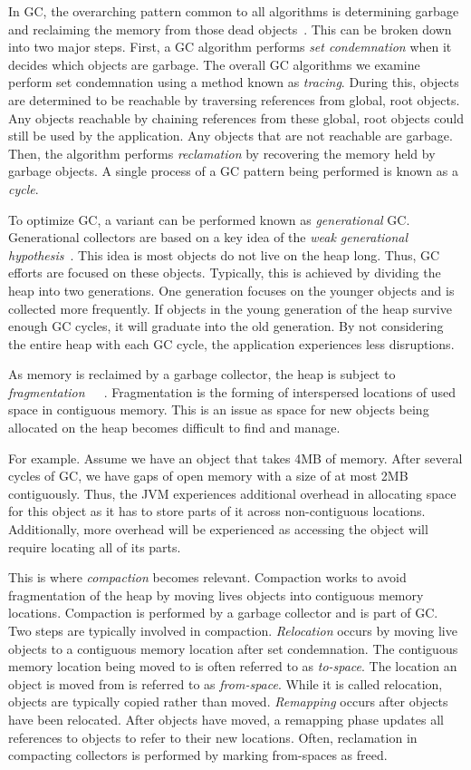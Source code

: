 \documentclass{sig-alternate}
\begin{document}
In GC, the overarching pattern common to all algorithms is determining garbage
and reclaiming the memory from those dead objects~\cite{wiki:gc}. This can be broken down into two major steps.
First, a GC algorithm performs \emph{set condemnation} when it decides which objects are 
garbage. The overall GC algorithms we examine perform set condemnation using a method 
known as \emph{tracing}. During this, objects are determined to be reachable by 
traversing references from global, root objects. Any objects reachable by chaining references
from these global, root objects could still be used by the application. 
Any objects that are not reachable are garbage.  Then, the algorithm performs 
\emph{reclamation} by recovering the memory held by garbage objects. A single
process of a GC pattern being performed is known as a \emph{cycle}.

To optimize GC, a variant can be performed known as \emph{generational} GC.
Generational collectors are based on a key idea of the \emph{weak generational hypothesis}~\cite{Tene:C4}.
This idea is most objects do not live on the 
heap long. Thus, GC efforts are focused on these objects. Typically, this is achieved
by dividing the heap into two generations. One generation focuses on the younger objects and
is collected more frequently. If objects in the young generation of the heap survive
enough GC cycles, it will graduate into the old generation. By not considering the entire
heap with each GC cycle, the application experiences less disruptions.

As memory is reclaimed by a garbage collector, the heap is subject to 
\emph{fragmentation}~\cite{Tene:C4}~\cite{Iyengar:Collie}~\cite{Osterlund:FPP}. Fragmentation is the forming
of interspersed locations of used space in contiguous memory. This
is an issue as space for new objects being allocated
on the heap becomes difficult to find and manage. 

For example. Assume
we have an object that takes 4MB of memory. After several cycles of GC,
we have gaps of open memory with a size of at most 2MB contiguously. Thus, 
the JVM experiences additional overhead in allocating space for this object
as it has to store parts of it across non-contiguous locations. Additionally,
more overhead will be experienced as accessing the object will require locating
all of its parts.

This is where \emph{compaction} becomes relevant. Compaction works to avoid
fragmentation of the heap by moving lives objects into contiguous memory locations.
Compaction is performed by a garbage collector and is part of GC. Two steps
are typically involved in compaction. \emph{Relocation} occurs by moving live objects
to a contiguous memory location after set condemnation.
The contiguous memory location being moved to is often referred to as \emph{to-space}.
The location an object is moved from is referred to as \emph{from-space}. While it is called 
relocation, objects are typically copied rather than moved. \emph{Remapping}
occurs after objects have been relocated. After objects have moved, a remapping phase 
updates all references to objects to refer to their new locations. Often, reclamation
in compacting collectors is performed by marking from-spaces as freed.
\end{document}
